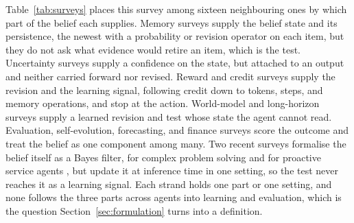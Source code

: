 Table~\ref{tab:surveys} places this survey among sixteen neighbouring ones by which part of the belief each supplies. Memory surveys \citep{zhang2024memory,hu2025memory,luo2026storage} supply the belief state and its persistence, the newest with a probability or revision operator on each item, but they do not ask what evidence would retire an item, which is the test. Uncertainty surveys \citep{xia2025uncertainty,lin2026uncertainty} supply a confidence on the state, but attached to an output and neither carried forward nor revised. Reward and credit surveys \citep{wu2025rewards,zheng2025prm,zhang2025landscape,zhang2026reasoning} supply the revision and the learning signal, following credit down to tokens, steps, and memory operations, and stop at the action. World-model and long-horizon surveys \citep{li2026bridging,chen2026horizon} supply a learned revision and test whose state the agent cannot read. Evaluation, self-evolution, forecasting, and finance surveys \citep{yehudai2025survey,gao2025survey,xu2026llm,dong2025finance} score the outcome and treat the belief as one component among many. Two recent surveys formalise the belief itself as a Bayes filter, for complex problem solving \citep{cai2026complex} and for proactive service agents \citep{tang2026proactive}, but update it at inference time in one setting, so the test never reaches it as a learning signal. Each strand holds one part or one setting, and none follows the three parts across agents into learning and evaluation, which is the question Section~\ref{sec:formulation} turns into a definition.
